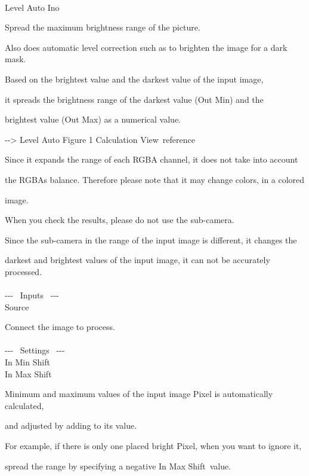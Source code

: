 \documentclass[a4paper,12pt]{article}
\begin{document}
\thispagestyle{empty}

\Large
\noindent \\
Level Auto Ino\medskip
\par
\normalsize
Spread the maximum brightness range of the picture.\\
\par
Also does automatic level correction such as to brighten the image for a dark mask.\\
\par
Based on the brightest value and the darkest value of the input image,\par
it spreads the brightness range of the darkest value (Out Min) and the\par
brightest value (Out Max) as a numerical value.\par
-{-}> \textquotedbl Level Auto Figure 1 Calculation View\textquotedbl \ reference\\
\par
Since it expands the range of each RGBA channel, it does not take into account\par
the RGBA\textquotesingle s balance. Therefore please note that it may change colors, in a colored\par
image.\\
\par
When you check the results, please do not use the sub-camera.\par
Since the sub-camera in the range of the input image is different, it changes the\par
darkest and brightest values of the input image, it can not be accurately processed.\\
\\
-{-}- \ Inputs \ -{-}-\\
Source\par
Connect the image to process.\\
\\
-{-}- \ Settings \ -{-}-\\
In Min Shift\\
In Max Shift\par
Minimum and maximum values of the input image Pixel is automatically calculated,\par
 and adjusted by adding to its value.\par
For example, if there is only one placed bright Pixel, when you want to ignore it,\par
spread the range by specifying a negative \textquotedbl In Max Shift\textquotedbl \ value.\par
\end{document}
